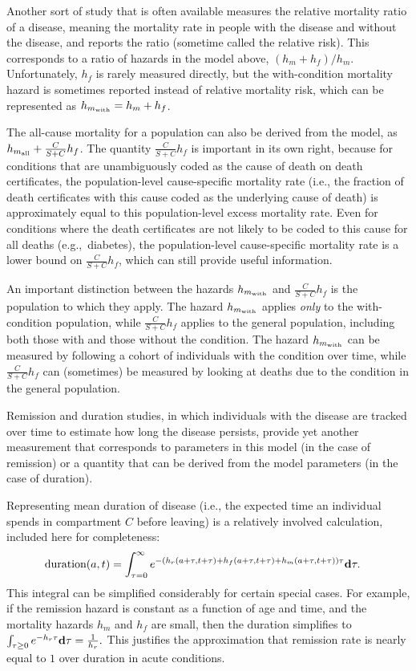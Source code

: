 Another sort of study that is often available
measures the relative mortality ratio of a disease, meaning the
mortality rate in people with the disease and without the disease, and
reports the ratio (sometime called the relative risk).  This
corresponds to a ratio of hazards in the model above, $(h_m+h_f) /
h_m$.  Unfortunately, $h_f$ is rarely measured directly, but the
with-condition mortality hazard is sometimes reported instead of
relative mortality risk, which can be represented as $h_{m_{\text{with}}} =
h_m+h_f$.

The all-cause mortality for a population can also be
derived from the model, as $h_{m_{\text{all}}} + \frac{C}{S+C}h_f$.  The quantity
$\frac{C}{S+C}h_f$ is important in its own right, because for
conditions that are unambiguously coded as the cause of death on death
certificates, the population-level cause-specific mortality rate
(i.e., the fraction of death certificates with this cause coded as the
underlying cause of death) is approximately equal to this
population-level excess mortality rate.  Even for conditions
where the death certificates are not likely to be coded to this cause
for all deaths (e.g.,~diabetes), the population-level cause-specific
mortality rate is a lower bound on $\frac{C}{S+C}h_f$, which can still
provide useful information.

An important distinction between the hazards $h_{m_{\text{with}}}$
and $\frac{C}{S+C}h_f$ is the population to which they
apply. The hazard $h_{m_{\text{with}}}$ applies \emph{only} to the with-condition
population, while $\frac{C}{S+C}h_f$ applies to the general
population, including both those with and those without the condition.  The hazard
$h_{m_{\text{with}}}$ can be measured by following a cohort of individuals
with the condition over time, while $\frac{C}{S+C}h_f$ can (sometimes)
be measured by looking at deaths due to the condition in the general
population.

Remission and duration studies, in which individuals with the disease are
tracked over time to estimate how long the disease persists, provide
yet another measurement that corresponds to parameters in this model
(in the case of remission) or a quantity that can be derived from the
model parameters (in the case of duration).

Representing mean duration of disease (i.e., the expected time an
individual spends in compartment $C$ before leaving) is a relatively
involved calculation, included here for completeness:
\begin{align*}
\text{duration}(a, t) &
= \int_{\tau = 0}^\infty e^{-\left(h_r(a+\tau, t+\tau) + h_f(a+\tau, t+\tau) + h_m(a+\tau, t+\tau)\right) \tau}\mathbf{d} \tau.
\end{align*}
This integral can be simplified considerably for certain special
cases.  For example, if the remission hazard is constant as a function
of age and time, and the mortality hazards $h_m$ and $h_f$ are small, then the duration
simplifies to $\int_{\tau \geq 0} e^{-h_r\tau}\mathbf{d} \tau =
\frac{1}{h_r}.$ This justifies the approximation that remission rate is
nearly equal to $1$ over duration in acute conditions.

